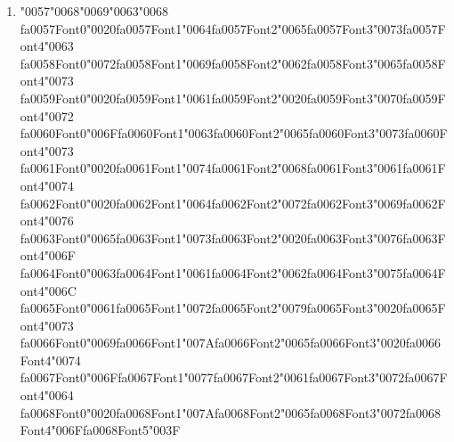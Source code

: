 \documentclass[11pt]{article}
\begin{document}
\begin{enumerate}[label=Q\arabic*., leftmargin=*]
\textbf{A.} A technique that compresses text by replacing consecutive repeated characters with a count and a symbol\\
\textbf{B.} A tokenization method that iteratively merges the most frequent pair of symbols in a corpus\\
\textbf{C.} A tokenization method that splits text based on whitespace and punctuation\\
\textbf{D.} A character-level encoding scheme that assigns fixed-length binary codes to characters

\item {\char"0057}{\char"0068}{\char"0069}{\char"0063}{\char"0068} {\csname fa0057Font0\endcsname\char"0020}{\csname fa0057Font1\endcsname\char"0064}{\csname fa0057Font2\endcsname\char"0065}{\csname fa0057Font3\endcsname\char"0073}{\csname fa0057Font4\endcsname\char"0063} {\csname fa0058Font0\endcsname\char"0072}{\csname fa0058Font1\endcsname\char"0069}{\csname fa0058Font2\endcsname\char"0062}{\csname fa0058Font3\endcsname\char"0065}{\csname fa0058Font4\endcsname\char"0073} {\csname fa0059Font0\endcsname\char"0020}{\csname fa0059Font1\endcsname\char"0061}{\csname fa0059Font2\endcsname\char"0020}{\csname fa0059Font3\endcsname\char"0070}{\csname fa0059Font4\endcsname\char"0072} {\csname fa0060Font0\endcsname\char"006F}{\csname fa0060Font1\endcsname\char"0063}{\csname fa0060Font2\endcsname\char"0065}{\csname fa0060Font3\endcsname\char"0073}{\csname fa0060Font4\endcsname\char"0073} {\csname fa0061Font0\endcsname\char"0020}{\csname fa0061Font1\endcsname\char"0074}{\csname fa0061Font2\endcsname\char"0068}{\csname fa0061Font3\endcsname\char"0061}{\csname fa0061Font4\endcsname\char"0074} {\csname fa0062Font0\endcsname\char"0020}{\csname fa0062Font1\endcsname\char"0064}{\csname fa0062Font2\endcsname\char"0072}{\csname fa0062Font3\endcsname\char"0069}{\csname fa0062Font4\endcsname\char"0076} {\csname fa0063Font0\endcsname\char"0065}{\csname fa0063Font1\endcsname\char"0073}{\csname fa0063Font2\endcsname\char"0020}{\csname fa0063Font3\endcsname\char"0076}{\csname fa0063Font4\endcsname\char"006F} {\csname fa0064Font0\endcsname\char"0063}{\csname fa0064Font1\endcsname\char"0061}{\csname fa0064Font2\endcsname\char"0062}{\csname fa0064Font3\endcsname\char"0075}{\csname fa0064Font4\endcsname\char"006C} {\csname fa0065Font0\endcsname\char"0061}{\csname fa0065Font1\endcsname\char"0072}{\csname fa0065Font2\endcsname\char"0079}{\csname fa0065Font3\endcsname\char"0020}{\csname fa0065Font4\endcsname\char"0073} {\csname fa0066Font0\endcsname\char"0069}{\csname fa0066Font1\endcsname\char"007A}{\csname fa0066Font2\endcsname\char"0065}{\csname fa0066Font3\endcsname\char"0020}{\csname fa0066Font4\endcsname\char"0074} {\csname fa0067Font0\endcsname\char"006F}{\csname fa0067Font1\endcsname\char"0077}{\csname fa0067Font2\endcsname\char"0061}{\csname fa0067Font3\endcsname\char"0072}{\csname fa0067Font4\endcsname\char"0064} {\csname fa0068Font0\endcsname\char"0020}{\csname fa0068Font1\endcsname\char"007A}{\csname fa0068Font2\endcsname\char"0065}{\csname fa0068Font3\endcsname\char"0072}{\csname fa0068Font4\endcsname\char"006F}{\csname fa0068Font5\endcsname\char"003F}\\[0.25em]

\end{enumerate}
\end{document}
